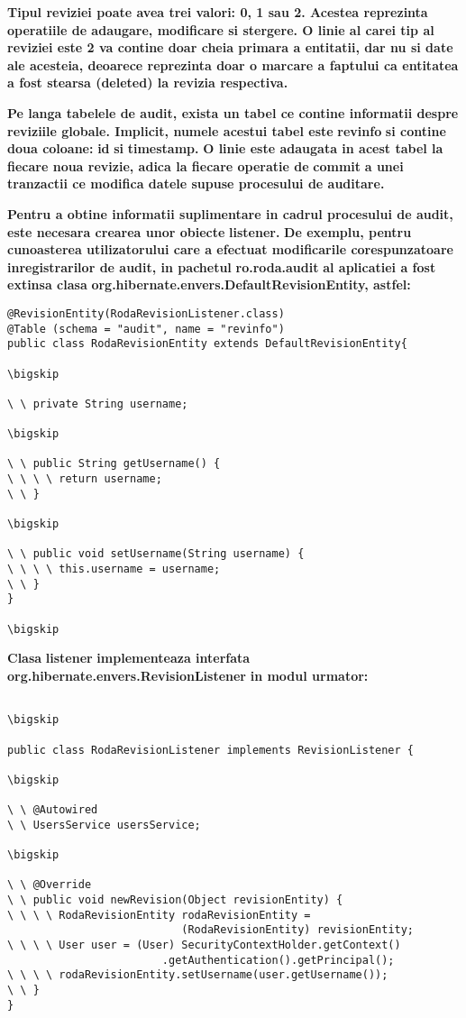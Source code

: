 \documentclass{article}
\begin{document}
\textbf{Tipul reviziei poate avea trei valori: 0, 1 sau 2. Acestea reprezinta operatiile de adaugare, modificare si stergere. O linie al carei tip al reviziei este 2 va contine doar cheia primara a entitatii, dar nu si date ale acesteia, deoarece reprezinta doar o marcare a faptului ca entitatea a fost stearsa (}\textbf{deleted}\textbf{) la revizia respectiva.}


\bigskip

\textbf{Pe langa tabelele de audit, exista un tabel ce contine informatii despre reviziile globale. Implicit, numele acestui tabel este }\textbf{revinfo}\textbf{ si contine doua coloane: }\textbf{id}\textbf{ si }\textbf{timestamp. }\textbf{O linie este adaugata in acest tabel la fiecare noua revizie, adica la fiecare operatie de }\textbf{commit}\textbf{ a unei tranzactii ce modifica datele supuse procesului de auditare. }


\bigskip

\textbf{Pentru a obtine informatii suplimentare in cadrul procesului de audit, este necesara crearea unor obiecte }\textbf{listener. }\textbf{De exemplu, pentru cunoasterea utilizatorului care a efectuat modificarile corespunzatoare inregistrarilor de audit, in pachetul }\textbf{ro.roda.audit}\textbf{ al aplicatiei a fost extinsa clasa }\textbf{org.hibernate.envers.DefaultRevisionEntity}\textbf{, astfel:}


\bigskip

\begin{verbatim}
@RevisionEntity(RodaRevisionListener.class)
@Table (schema = "audit", name = "revinfo")
public class RodaRevisionEntity extends DefaultRevisionEntity{

\bigskip

\ \ private String username;

\bigskip

\ \ public String getUsername() {
\ \ \ \ return username;
\ \ }

\bigskip

\ \ public void setUsername(String username) {
\ \ \ \ this.username = username;
\ \ }
}

\bigskip

\end{verbatim}
\textbf{Clasa }\textbf{listener}\textbf{ implementeaza interfata }\textbf{org.hibernate.envers.RevisionListener}\textbf{ in modul urmator:}

\begin{verbatim}

\bigskip

public class RodaRevisionListener implements RevisionListener {

\bigskip

\ \ @Autowired
\ \ UsersService usersService;

\bigskip

\ \ @Override
\ \ public void newRevision(Object revisionEntity) {
\ \ \ \ RodaRevisionEntity rodaRevisionEntity = 
                           (RodaRevisionEntity) revisionEntity;
\ \ \ \ User user = (User) SecurityContextHolder.getContext()
                        .getAuthentication().getPrincipal();
\ \ \ \ rodaRevisionEntity.setUsername(user.getUsername());
\ \ }
}
\end{verbatim}
\end{document}
